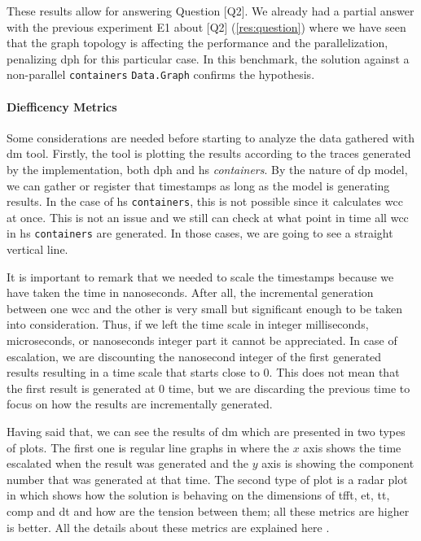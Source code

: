 \documentclass[preprint]{elsarticle}
\begin{document}
These results allow for answering Question [Q2].
We already had a partial answer with the previous experiment E1 about [Q2] (\autoref{res:question}) where we have seen that the graph topology is affecting the performance and the parallelization, penalizing \acrshort{dph} for this particular case. In this benchmark, the solution against a non-parallel \texttt{containers} \texttt{Data.Graph} confirms the hypothesis. 

\paragraph{Diefficency Metrics}\label{sub:sub:sec:e2}
Some considerations are needed before starting to analyze the data gathered with \acrshort{dm} tool. Firstly, the tool is plotting the results according to the traces generated by the implementation, both \acrshort{dph} and \acrshort{hs} \emph{containers}. By the nature of \acrshort{dp} model, we can gather or register that timestamps as long as the model is generating results. In the case of \acrshort{hs} \texttt{containers}, this is not possible since it calculates \acrshort{wcc} at once. This is not an issue and we still can check at what point in time all \acrshort{wcc} in \acrshort{hs} \texttt{containers} are generated. In those cases, we are going to see a straight vertical line. 

It is important to remark that we needed to scale the timestamps because we have taken the time in nanoseconds. After all, the incremental generation between one \acrshort{wcc} and the other is very small but significant enough to be taken into consideration. Thus, if we left the time scale in integer milliseconds, microseconds, or nanoseconds integer part it cannot be appreciated. In case of escalation, we are discounting the nanosecond integer of the first generated results resulting in a time scale that starts close to $0$. This does not mean that the first result is generated at $0$ time, but we are discarding the previous time to focus on how the results are incrementally generated.

Having said that, we can see the results of \acrshort{dm} which are presented in two types of plots. The first one is regular line graphs in where the $x$ axis shows the time escalated when the result was generated and the $y$ axis is showing the component number that was generated at that time. The second type of plot is a radar plot in which shows how the solution is behaving on the dimensions of  \acrfull{tfft}, \acrfull{et}, \acrfull{tt}, \acrfull{comp} and \acrfull{dt} and how are the tension between them; all these metrics are higher is better. All the details about these metrics are explained here \cite{diefpaper}.
\end{document}
